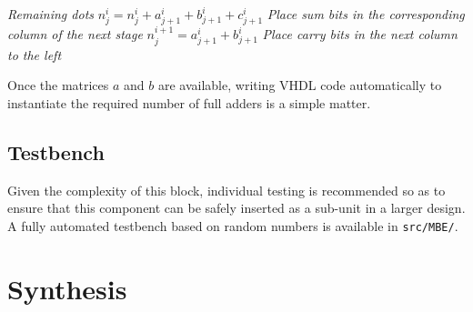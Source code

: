 \begin{algorithmic}
		\ELSE
		\ENDIF
		 \textit{ Remaining dots}
		\STATE $n_j^i = n_j^i + a_{j+1}^i + b_{j+1}^i + c_{j+1}^i$ \textit{Place sum bits in the corresponding column of the next stage}
		\STATE $n_j^{i+1} = a_{j+1}^i + b_{j+1}^i$ \textit{Place carry bits in the next column to the left}
		\ENDFOR
	\ENDFOR
\end{algorithmic}

Once the matrices $a$ and $b$ are available, writing VHDL code automatically to instantiate the required number of full adders is a simple matter.


\subsection{Testbench} Given the complexity of this block, individual testing is recommended so as to ensure that this component can be safely inserted as a sub-unit in a larger design. A fully automated testbench based on random numbers is available in \texttt{src/MBE/}.

\section{Synthesis}

